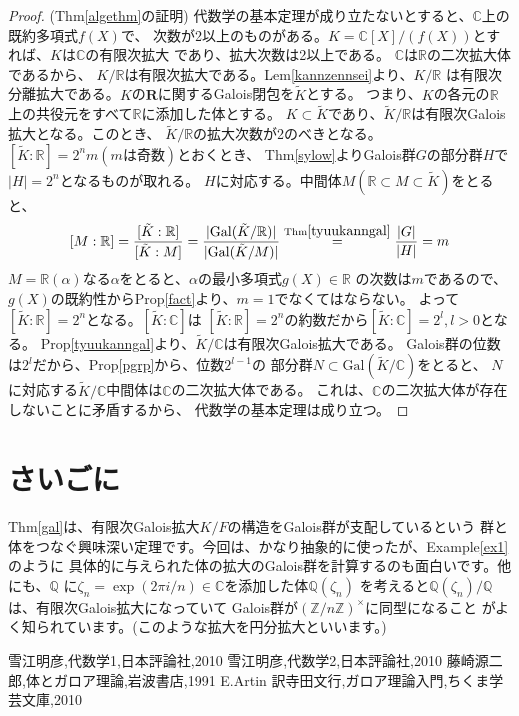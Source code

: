 \documentclass[dvipdfmx]{jsarticle}
\theoremstyle{definition}
\begin{document}
\begin{proof}(Thm\ref{algethm}の証明)
代数学の基本定理が成り立たないとすると、$\mathbb{C}$上の既約多項式$f(X)$で、
次数が2以上のものがある。$K=\mathbb{C}[X]/(f(X))$とすれば、$K$は$\mathbb{C}$の有限次拡大
であり、拡大次数は2以上である。 $\mathbb{C}$は$\mathbb{R}$の二次拡大体であるから、
$K/\mathbb{R}$は有限次拡大である。Lem\ref{kannzennsei}より、$K/\mathbb{R}$
は有限次分離拡大である。$K$の$\mathbf{R}$に関するGalois閉包を$\tilde{K}$とする。
つまり、$K$の各元の$\mathbb{R}$上の共役元をすべて$\mathbb{R}$に添加した体とする。
$K\subset\tilde{K}$であり、$\tilde{K}/\mathbb{R}$は有限次Galois拡大となる。このとき、
$\tilde{K}/\mathbb{R}$の拡大次数が2のべきとなる。\\
$[\tilde{K}:\mathbb{R}]=2^nm(m\mathrm{は奇数})$とおくとき、
Thm\ref{sylow}よりGalois群$G$の部分群$H$で$|H|=2^n$となるものが取れる。
$H$に対応する。中間体$M(\mathbb{R}\subset M\subset \tilde{K})$をとると、
\[[M:\mathbb{R}]=\frac{[\tilde{K}:\mathbb{R}]}{[\tilde{K}:M]}
                =\frac{|\mathrm{Gal}(\tilde{K}/\mathbb{R})|}{|\mathrm{Gal}(\tilde{K}/M)|}
                \overset{\mathrm{Thm}\ref{tyuukanngal}}{=}\frac{|G|}{|H|}
                =m\]
$M=\mathbb{R}(\alpha)$なる$\alpha$をとると、$\alpha$の最小多項式$g(X)\in\mathbb{R}$
の次数は$m$であるので、$g(X)$の既約性からProp\ref{fact}より、$m=1$でなくてはならない。
よって$[\tilde{K}:\mathbb{R}]=2^n$となる。$[\tilde{K}:\mathbb{C}]$は
$[\tilde{K}:\mathbb{R}]=2^n$の約数だから$[\tilde{K}:\mathbb{C}]=2^l,l>0$となる。
Prop\ref{tyuukanngal}より、$\tilde{K}/\mathbb{C}$は有限次Galois拡大である。
Galois群の位数は$2^l$だから、Prop\ref{pgrp}から、位数$2^{l-1}$の
部分群$N\subset \mathrm{Gal}(\tilde{K}/\mathbb{C})$をとると、
$N$に対応する$\tilde{K}/\mathbb{C}$中間体は$\mathbb{C}$の二次拡大体である。
これは、$\mathbb{C}$の二次拡大体が存在しないことに矛盾するから、
代数学の基本定理は成り立つ。
\end{proof}
\newpage
\section{さいごに}
Thm\ref{gal}は、有限次Galois拡大$K/F$の構造をGalois群が支配しているという
群と体をつなぐ興味深い定理です。今回は、かなり抽象的に使ったが、Example\ref{ex1}のように
具体的に与えられた体の拡大のGalois群を計算するのも面白いです。他にも、$\mathbb{Q}$
に$\zeta _n=\exp (2\pi i/n)\in\mathbb{C}$を添加した体$\mathbb{Q}(\zeta_n)$
を考えると$\mathbb{Q}(\zeta _n)/\mathbb{Q}$は、有限次Galois拡大になっていて
Galois群が$\left(\mathbb{Z}/n\mathbb{Z}\right)^{\times}$に同型になること
がよく知られています。(このような拡大を円分拡大といいます。)

\begin{thebibliography}{10}
 \newblock 雪江明彦,代数学1,日本評論社,2010
 \newblock 雪江明彦,代数学2,日本評論社,2010
 \newblock 藤崎源二郎,体とガロア理論,岩波書店,1991
 \newblock E.Artin 訳寺田文行,ガロア理論入門,ちくま学芸文庫,2010
\end{thebibliography}
\end{document}
